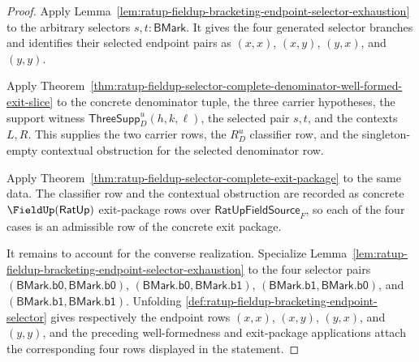 \begin{proof}
Apply Lemma~\ref{lem:ratup-fieldup-bracketing-endpoint-selector-exhaustion} to
the arbitrary selectors $s,t:\mathsf{BMark}$. It gives the four generated
selector branches and identifies their selected endpoint pairs as $(x,x)$,
$(x,y)$, $(y,x)$, and $(y,y)$.

Apply Theorem~\ref{thm:ratup-fieldup-selector-complete-denominator-well-formed-exit-slice}
to the concrete denominator tuple, the three carrier hypotheses, the support
witness $\mathsf{ThreeSupp}_D^u(h,k,\ell)$, the selected pair $s,t$, and the
contexts $L,R$. This supplies the two carrier rows, the $R_D^u$ classifier row,
and the singleton-empty contextual obstruction for the selected denominator
row.

Apply Theorem~\ref{thm:ratup-fieldup-selector-complete-exit-package} to the
same data. The classifier row and the contextual obstruction are recorded as
concrete $\FieldUp(\mathsf{RatUp})$ exit-package rows over
$\mathsf{RatUpFieldSource}_F$, so each of the four cases is an admissible row
of the concrete exit package.

It remains to account for the converse realization. Specialize
Lemma~\ref{lem:ratup-fieldup-bracketing-endpoint-selector-exhaustion} to the
four selector pairs
$(\mathsf{BMark.b0},\mathsf{BMark.b0})$,
$(\mathsf{BMark.b0},\mathsf{BMark.b1})$,
$(\mathsf{BMark.b1},\mathsf{BMark.b0})$, and
$(\mathsf{BMark.b1},\mathsf{BMark.b1})$. Unfolding
\autoref{def:ratup-fieldup-bracketing-endpoint-selector} gives respectively
the endpoint rows $(x,x)$, $(x,y)$, $(y,x)$, and $(y,y)$, and the preceding
well-formedness and exit-package applications attach the corresponding four
rows displayed in the statement.
\end{proof}

